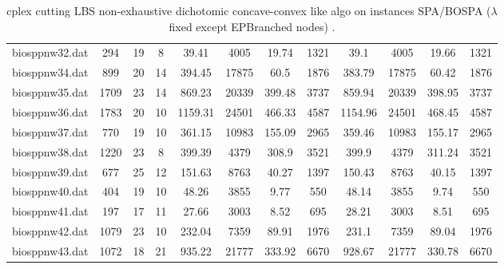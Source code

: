 \begin{sidewaystable}[!ht]
{\begin{tabular}{lccccccccccc}
biosppnw32.dat & 294 & 19 & 8 & 39.41 & 4005 & 19.74 & 1321 & 39.1 & 4005 &  \textcolor{blue2}{19.66} & 1321 \\
biosppnw34.dat & 899 & 20 & 14 & 394.45 & 17875 & 60.5 & 1876 & 383.79 & 17875 &  \textcolor{blue2}{60.42} & 1876 \\
biosppnw35.dat & 1709 & 23 & 14 & 869.23 & 20339 & 399.48 & 3737 & 859.94 & 20339 & 398.95 & 3737 \\
biosppnw36.dat & 1783 & 20 & 10 & 1159.31 & 24501 & 466.33 & 4587 & 1154.96 & 24501 & 468.45 & 4587 \\
biosppnw37.dat & 770 & 19 & 10 & 361.15 & 10983 &  \textcolor{blue2}{155.09} & 2965 & 359.46 & 10983 & 155.17 & 2965 \\
biosppnw38.dat & 1220 & 23 & 8 & 399.39 & 4379 & 308.9 & 3521 & 399.9 & 4379 & 311.24 & 3521 \\
biosppnw39.dat & 677 & 25 & 12 & 151.63 & 8763 & 40.27 & 1397 & 150.43 & 8763 &  \textcolor{blue2}{40.15} & 1397 \\
biosppnw40.dat & 404 & 19 & 10 & 48.26 & 3855 & 9.77 & 550 & 48.14 & 3855 &  \textcolor{blue2}{9.74} & 550 \\
biosppnw41.dat & 197 & 17 & 11 & 27.66 & 3003 & 8.52 & 695 & 28.21 & 3003 &  \textcolor{blue2}{8.51} & 695 \\
biosppnw42.dat & 1079 & 23 & 10 & 232.04 & 7359 & 89.91 & 1976 & 231.1 & 7359 &  \textcolor{blue2}{89.04} & 1976 \\
biosppnw43.dat & 1072 & 18 & 21 & 935.22 & 21777 & 333.92 & 6670 & 928.67 & 21777 &  \textcolor{blue2}{330.78} & 6670 \\
\bottomrule
\end{tabular}
}%
\caption{cplex cutting LBS non-exhaustive dichotomic concave-convex like algo on instances SPA/BOSPA ($\lambda$ fixed except EPBranched nodes) .}
\end{sidewaystable}
